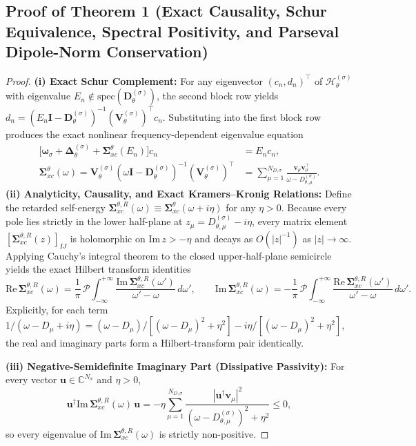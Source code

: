 \documentclass[10pt,a4paper]{article}
\newcommand{\Hlift}{\mathcal{H}_\theta^{(\sigma)}}
\newcommand{\Sig}{\mathbf{\Sigma}_{xc}^\theta}
\newcommand{\SigR}{\mathbf{\Sigma}_{xc}^{\theta,R}}
\begin{document}
\subsection*{Proof of Theorem 1 (Exact Causality, Schur Equivalence, Spectral Positivity, and Parseval Dipole-Norm Conservation)}
\begin{proof}
\textbf{(i) Exact Schur Complement:} For any eigenvector $(c_n, d_n)^\top$ of $\Hlift$ with eigenvalue $E_n \notin \mathrm{spec}(\mathbf{D}_\theta^{(\sigma)})$, the second block row yields $d_n = (E_n \mathbf{I} - \mathbf{D}_\theta^{(\sigma)})^{-1} (\mathbf{V}_\theta^{(\sigma)})^\top c_n$. Substituting into the first block row produces the exact nonlinear frequency-dependent eigenvalue equation
\begin{align}
\bigl[\boldsymbol{\omega}_\sigma + \boldsymbol{\Delta}_\theta^{(\sigma)} + \Sig(E_n)\bigr] c_n &= E_n c_n, \\
\Sig(\omega) = \mathbf{V}_\theta^{(\sigma)}(\omega\mathbf{I} - \mathbf{D}_\theta^{(\sigma)})^{-1}(\mathbf{V}_\theta^{(\sigma)})^\top &= \sum_{\mu=1}^{N_{D,\sigma}} \frac{\mathbf{v}_\mu \mathbf{v}_\mu^\top}{\omega - D_{\theta,\mu}^{(\sigma)}}.
\end{align}
\textbf{(ii) Analyticity, Causality, and Exact Kramers--Kronig Relations:} Define the retarded self-energy $\SigR(\omega) \equiv \Sig(\omega + i\eta)$ for any $\eta > 0$. Because every pole lies strictly in the lower half-plane at $z_\mu = D_{\theta,\mu}^{(\sigma)} - i\eta$, every matrix element $[\SigR(z)]_{IJ}$ is holomorphic on $\mathrm{Im}\,z > -\eta$ and decays as $O(|z|^{-1})$ as $|z|\to\infty$. Applying Cauchy's integral theorem to the closed upper-half-plane semicircle yields the exact Hilbert transform identities
\begin{equation}
\mathrm{Re}\,\SigR(\omega) = \frac{1}{\pi}\,\mathcal{P}\!\int_{-\infty}^{+\infty} \frac{\mathrm{Im}\,\SigR(\omega')}{\omega' - \omega}\,d\omega', \qquad
\mathrm{Im}\,\SigR(\omega) = -\frac{1}{\pi}\,\mathcal{P}\!\int_{-\infty}^{+\infty} \frac{\mathrm{Re}\,\SigR(\omega')}{\omega' - \omega}\,d\omega'.
\end{equation}
Explicitly, for each term $1/(\omega - D_\mu + i\eta) = (\omega-D_\mu)/[(\omega-D_\mu)^2+\eta^2] - i\eta/[(\omega-D_\mu)^2+\eta^2]$, the real and imaginary parts form a Hilbert-transform pair identically.

\textbf{(iii) Negative-Semidefinite Imaginary Part (Dissipative Passivity):} For every vector $\mathbf{u}\in\mathbb{C}^{N_\sigma}$ and $\eta > 0$,
\begin{equation}
\mathbf{u}^\dagger \mathrm{Im}\,\SigR(\omega)\,\mathbf{u} = -\eta \sum_{\mu=1}^{N_{D,\sigma}} \frac{|\mathbf{u}^\dagger \mathbf{v}_\mu|^2}{(\omega - D_{\theta,\mu}^{(\sigma)})^2 + \eta^2} \le 0,
\end{equation}
so every eigenvalue of $\mathrm{Im}\,\SigR(\omega)$ is strictly non-positive.


\end{proof}
\end{document}
